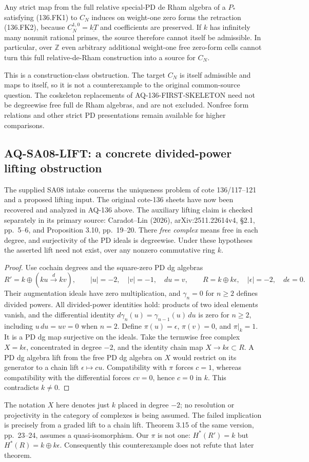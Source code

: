 Any strict map from the full relative special-PD de Rham
algebra of a $P_*$ satisfying (136.FK1) to $C_N$ induces
on weight-one zero forms the retraction (136.FK2), because
$C_N^{1,0}=\underline{kT}$ and coefficients are preserved.
If $k$ has infinitely many nonunit rational primes, the
source therefore cannot itself be admissible.
In particular, over $\mathbb Z$ even arbitrary additional
weight-one free zero-form cells cannot turn this full
relative-de-Rham construction into a source for $C_N$.

This is a construction-class obstruction. The target
$C_N$ is itself admissible and maps to itself, so it is
not a counterexample to the original common-source question.
The coskeleton replacements of AQ-136-FIRST-SKELETON need
not be degreewise free full de Rham algebras, and are not
excluded. Nonfree form relations and other strict PD
presentations remain available for higher comparisons.


\subsection{AQ-SA08-LIFT: a concrete divided-power lifting obstruction}
The supplied SA08 intake concerns the uniqueness problem
of cote 136/117--121 and a proposed lifting input.
The original cote-136 sheets have now been recovered and
analyzed in AQ-136 above.  The auxiliary lifting claim
is checked separately in its primary source: Caradot--Lin (2026),
arXiv:2511.22614v4, \S2.1, pp.~5--6, and
Proposition 3.10, pp.~19--20.
There \emph{free complex} means free in each degree,
and surjectivity of the PD ideals is degreewise.
Under these hypotheses the asserted lift need not exist,
over any nonzero commutative ring $k$.
\begin{proof}
Use cochain degrees and the square-zero PD dg algebras
\[
 R'=k\oplus(ku\xrightarrow{\,d\,}kv),\qquad
 |u|=-2,\quad |v|=-1,\quad du=v,
 \qquad R=k\oplus k\epsilon,\quad|\epsilon|=-2,\quad d\epsilon=0.
\]
Their augmentation ideals have zero multiplication,
and $\gamma_n=0$ for $n\geq2$ defines divided powers.
All divided-power identities hold: products of two
ideal elements vanish, and the differential identity
$d\gamma_n(u)=\gamma_{n-1}(u)\,du$ is zero for $n\geq2$,
including $u\,du=uv=0$ when $n=2$.
Define $\pi(u)=\epsilon$, $\pi(v)=0$, and $\pi|_k=1$.
It is a PD dg map surjective on the ideals.
Take the termwise free complex $X=k\epsilon$,
concentrated in degree $-2$, and the identity chain
map $X\to k\epsilon\subset R$.
A PD dg algebra lift from the free PD dg algebra
on $X$ would restrict on its generator to a chain
lift $\epsilon\mapsto cu$.
Compatibility with $\pi$ forces $c=1$, whereas
compatibility with the differential forces $cv=0$,
hence $c=0$ in $k$. This contradicts $k\ne0$.
\end{proof}
The notation $X$ here denotes just $k$ placed in
degree $-2$; no resolution or projectivity in the
category of complexes is being assumed.
The failed implication is precisely from a graded
lift to a chain lift. Theorem 3.15 of the same
version, pp.~23--24, assumes a quasi-isomorphism.
Our $\pi$ is not one:
$H^*(R')=k$ but $H^*(R)=k\oplus k\epsilon$.
Consequently this counterexample does not refute
that later theorem.

